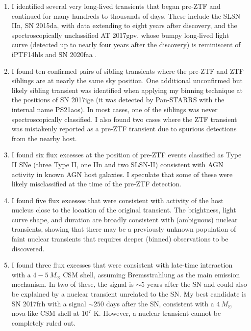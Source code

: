 \documentclass[a4paper,oneside,12pt, class=Latex/Classes/PhDthesisPSnPDF, crop=false]{standalone}
\begin{document}
\begin{enumerate}
    \item I identified several very long-lived transients that began pre-ZTF and continued for many hundreds to thousands of days. These include the SLSN IIn, SN 2015da, with data extending to eight years after discovery, and the spectroscopically unclassified AT 2017gpv, whose bumpy long-lived light curve (detected up to nearly four years after the discovery) is reminiscent of iPTF14hls \citep{iPTF14hls_Iair, Sollerman_2019_iptf14hls} and SN 2020faa \citep{Yang_2021_20faa, 2020faa_hidden_shocks}. 
    \item I found ten confirmed pairs of sibling transients where the pre-ZTF and ZTF siblings are at nearly the same sky position. One additional unconfirmed but likely sibling transient was identified when applying my binning technique at the positions of SN 2017ige (it was detected by Pan-STARRS with the internal name PS21aos). In most cases, one of the siblings was never spectroscopically classified. I also found two cases where the ZTF transient was mistakenly reported as a pre-ZTF transient due to spurious detections from the nearby host.
    \item I found six flux excesses at the position of pre-ZTF events classified as Type II SNe (three Type II, one IIn and two SLSN-II) consistent with AGN activity in known AGN host galaxies. I speculate that some of these were likely misclassified at the time of the pre-ZTF detection.
    \item I found five flux excesses that were consistent with activity of the host nucleus close to the location of the original transient. The brightness, light curve shape, and duration are broadly consistent with (ambiguous) nuclear transients, showing that there may be a previously unknown population of faint nuclear transients that requires deeper (binned) observations to be discovered.
    \item I found three flux excesses that were consistent with late-time interaction with a $4 - 5\ M_\odot$ CSM shell, assuming Bremsstrahlung as the main emission mechanism. In two of these, the signal is $\sim5$ years after the SN and could also be explained by a nuclear transient unrelated to the SN. My best candidate is SN 2017frh with a signal $\sim250$ days after the SN, consistent with a $4\ M_\odot$ nova-like CSM shell at $10^7$ K. However, a nuclear transient cannot be completely ruled out.
 \end{enumerate}
\end{document}
